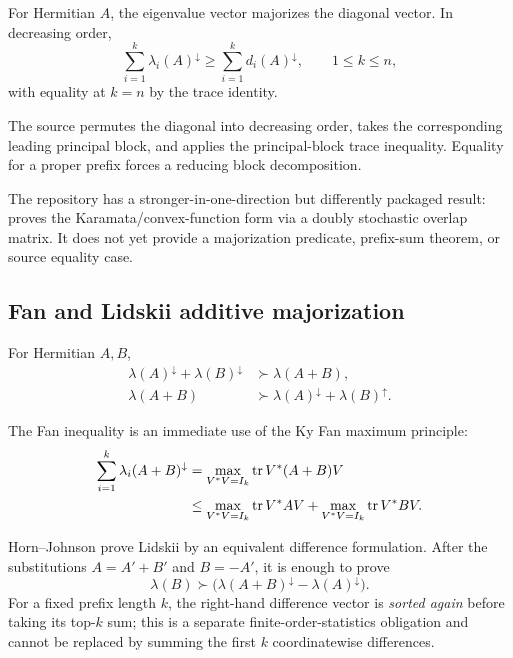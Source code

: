 For Hermitian $A$, the eigenvalue vector majorizes the diagonal vector. In decreasing order,
\begin{equation}
  \sum_{i=1}^k\lambda_i(A)^{\downarrow}
  \ge\sum_{i=1}^k d_i(A)^{\downarrow},
  \qquad 1\le k\le n, \tag{HJ-Schur}
\end{equation}
with equality at $k=n$ by the trace identity.

The source permutes the diagonal into decreasing order, takes the corresponding leading principal block, and applies the principal-block trace inequality. Equality for a proper prefix forces a reducing block decomposition.

The repository has a stronger-in-one-direction but differently packaged result:  proves the Karamata/convex-function form via a doubly stochastic overlap matrix. It does not yet provide a majorization predicate, prefix-sum theorem, or source equality case.

\subsection{Fan and Lidskii additive majorization}

For Hermitian $A,B$,
\begin{align}
  \lambda(A)^{\downarrow}+\lambda(B)^{\downarrow}
  &\succ \lambda(A+B), \tag{HJ-Fan-majorization}\\
  \lambda(A+B)
  &\succ \lambda(A)^{\downarrow}+\lambda(B)^{\uparrow}. \tag{HJ-Lidskii}
\end{align}

The Fan inequality is an immediate use of the Ky Fan maximum principle:
\begin{align*}
  \sum_{i=1}^k\lambda_i(A+B)^{\downarrow}
  &=\max_{V^*V=I_k}\operatorname{tr} V^*(A+B)V\\
  &\le \max_{V^*V=I_k}\operatorname{tr} V^*AV
      +\max_{V^*V=I_k}\operatorname{tr} V^*BV.
\end{align*}

Horn--Johnson prove Lidskii by an equivalent difference formulation. After the substitutions $A=A'+B'$ and $B=-A'$, it is enough to prove
\[
  \lambda(B)\succ
  \bigl(\lambda(A+B)^{\downarrow}-\lambda(A)^{\downarrow}\bigr).
\]
For a fixed prefix length $k$, the right-hand difference vector is \emph{sorted again} before taking its top-$k$ sum; this is a separate finite-order-statistics obligation and cannot be replaced by summing the first $k$ coordinatewise differences.


